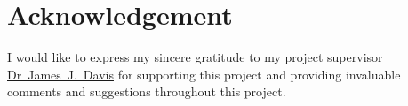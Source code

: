 \renewcommand{\baselinestretch}{1.5}
\chapter{Acknowledgement}
\renewcommand{\baselinestretch}{\mystretch}


I would like to express my sincere gratitude to my project supervisor \href{james.davis06@imperial.ac.uk}{Dr~James~J.~Davis} for supporting this project and providing invaluable comments and suggestions throughout this project.
